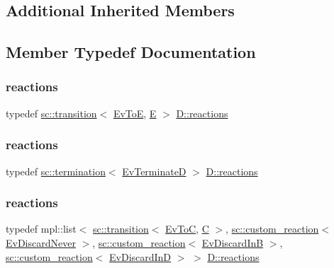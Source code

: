 \subsection*{Additional Inherited Members}


\subsection{Member Typedef Documentation}
\mbox{\label{struct_d_a6f70b78871d2b3343b3d92a9152c12b3}} 
\subsubsection{\texorpdfstring{reactions}{reactions}\hspace{0.1cm}{\footnotesize\ttfamily [1/3]}}
{\footnotesize\ttfamily typedef \mbox{\hyperlink{classboost_1_1statechart_1_1transition}{sc\+::transition}}$<$ \mbox{\hyperlink{struct_ev_to_e}{Ev\+ToE}}, \mbox{\hyperlink{struct_e}{E}} $>$ \mbox{\hyperlink{struct_d_a764cb536c7fd0b2c7008765ad2cea341}{D\+::reactions}}}

\mbox{\label{struct_d_a754e5c374aa134a2b348c7f0dca8c099}} 
\subsubsection{\texorpdfstring{reactions}{reactions}\hspace{0.1cm}{\footnotesize\ttfamily [2/3]}}
{\footnotesize\ttfamily typedef \mbox{\hyperlink{classboost_1_1statechart_1_1termination}{sc\+::termination}}$<$ \mbox{\hyperlink{struct_ev_terminate_d}{Ev\+TerminateD}} $>$ \mbox{\hyperlink{struct_d_a764cb536c7fd0b2c7008765ad2cea341}{D\+::reactions}}}

\mbox{\label{struct_d_a764cb536c7fd0b2c7008765ad2cea341}} 
\subsubsection{\texorpdfstring{reactions}{reactions}\hspace{0.1cm}{\footnotesize\ttfamily [3/3]}}
{\footnotesize\ttfamily typedef mpl\+::list$<$ \mbox{\hyperlink{classboost_1_1statechart_1_1transition}{sc\+::transition}}$<$ \mbox{\hyperlink{struct_ev_to_c}{Ev\+ToC}}, \mbox{\hyperlink{struct_c}{C}} $>$, \mbox{\hyperlink{classboost_1_1statechart_1_1custom__reaction}{sc\+::custom\+\_\+reaction}}$<$ \mbox{\hyperlink{struct_ev_discard_never}{Ev\+Discard\+Never}} $>$, \mbox{\hyperlink{classboost_1_1statechart_1_1custom__reaction}{sc\+::custom\+\_\+reaction}}$<$ \mbox{\hyperlink{struct_ev_discard_in_b}{Ev\+Discard\+InB}} $>$, \mbox{\hyperlink{classboost_1_1statechart_1_1custom__reaction}{sc\+::custom\+\_\+reaction}}$<$ \mbox{\hyperlink{struct_ev_discard_in_d}{Ev\+Discard\+InD}} $>$ $>$ \mbox{\hyperlink{struct_d_a764cb536c7fd0b2c7008765ad2cea341}{D\+::reactions}}}



